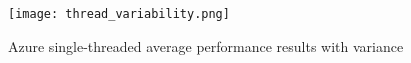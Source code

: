 \documentclass[conference]{IEEEtran}
\begin{document}
\begin{table*}[!h]
\begin{adjustbox}{width=\linewidth,center}
\end{adjustbox}
\end{table*}

\begin{figure}[ht]
  \centering
  \texttt{[image: thread\_variability.png]}
  \caption{Azure single-threaded average performance results with variance}
  \label{fig:threadvariability}
\end{figure}
\end{document}
